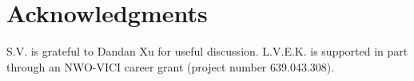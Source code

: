 \documentclass[useAMS,usenatbib]{mnras}
\begin{document}

\section*{Acknowledgments}
S.V. is grateful to Dandan Xu for useful discussion.
L.V.E.K. is supported in part through an NWO-VICI career grant (project number 639.043.308).






\label{lastpage}
\end{document}
